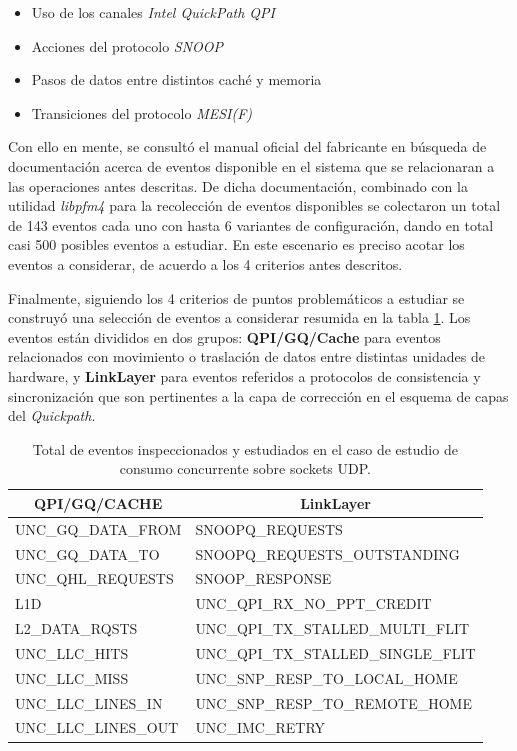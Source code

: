 \begin{itemize}
\item Uso de los canales \emph{Intel QuickPath QPI}
\item Acciones del protocolo \emph{SNOOP}
\item Pasos de datos entre distintos caché y memoria
\item Transiciones del protocolo \emph{MESI(F)}
\end{itemize}

Con ello en mente, se consultó el manual oficial del fabricante \cite{manual:bigbigevents} en búsqueda de documentación acerca de eventos disponible en el sistema que se relacionaran a las operaciones antes descritas. De dicha documentación, combinado con la utilidad \emph{libpfm4} para la recolección de eventos disponibles se colectaron un total de 143 eventos cada uno con hasta 6 variantes de configuración, dando en total casi 500 posibles eventos a estudiar. En este escenario es preciso acotar los eventos a considerar, de acuerdo a los 4 criterios antes descritos.



Finalmente, siguiendo los 4 criterios de puntos problemáticos a estudiar se construyó una selección de eventos a considerar resumida en la tabla \ref{table:eventos}. Los eventos están divididos en dos grupos: \textbf{QPI/GQ/Cache} para eventos relacionados con movimiento o traslación de datos entre distintas unidades de hardware, y \textbf{LinkLayer} para eventos referidos a protocolos de consistencia y sincronización que son pertinentes a la capa de corrección en el esquema de capas del \emph{Quickpath}.

\begin{table}[h!]
\centering
\begin{tabular}{l|l}
\multicolumn{1}{c|}{{\bf QPI/GQ/CACHE}} & \multicolumn{1}{c}{{\bf LinkLayer}} \\ \hline
{ UNC\_GQ\_DATA\_FROM} & SNOOPQ\_REQUESTS \\
{ UNC\_GQ\_DATA\_TO} & SNOOPQ\_REQUESTS\_OUTSTANDING \\
{ UNC\_QHL\_REQUESTS} & SNOOP\_RESPONSE \\
{ L1D} & UNC\_QPI\_RX\_NO\_PPT\_CREDIT \\
{ L2\_DATA\_RQSTS} & UNC\_QPI\_TX\_STALLED\_MULTI\_FLIT \\
{ UNC\_LLC\_HITS} & UNC\_QPI\_TX\_STALLED\_SINGLE\_FLIT \\
{ UNC\_LLC\_MISS} & UNC\_SNP\_RESP\_TO\_LOCAL\_HOME \\
{ UNC\_LLC\_LINES\_IN} & UNC\_SNP\_RESP\_TO\_REMOTE\_HOME \\
{ UNC\_LLC\_LINES\_OUT} & UNC\_IMC\_RETRY
\end{tabular}
\caption{Total de eventos inspeccionados y estudiados en el caso de estudio de consumo concurrente sobre sockets UDP.}
\label{table:eventos}
\end{table}

